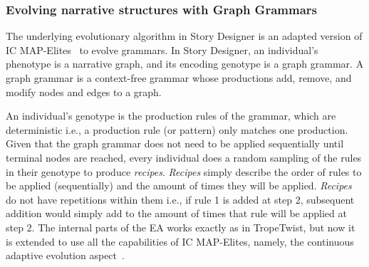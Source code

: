 




\subsubsection{Evolving narrative structures with Graph Grammars}

The underlying evolutionary algorithm in Story Designer is an adapted version of IC MAP-Elites~ to evolve grammars. In Story Designer, an individual's phenotype is a narrative graph, and its encoding genotype is a graph grammar. A graph grammar is a context-free grammar whose productions add, remove, and modify nodes and edges to a graph. 

An individual's genotype is the production rules of the grammar, which are deterministic i.e., a production rule (or pattern) only matches one production. Given that the graph grammar does not need to be applied sequentially until terminal nodes are reached, every individual does a random sampling of the rules in their genotype to produce \emph{recipes}. \emph{Recipes} simply describe the order of rules to be applied (sequentially) and the amount of times they will be applied. \emph{Recipes} do not have repetitions within them i.e., if rule 1 is added at step 2, subsequent addition would simply add to the amount of times that rule will be applied at step 2. The internal parts of the EA works exactly as in TropeTwist, but now it is extended to use all the capabilities of IC MAP-Elites, namely, the continuous adaptive evolution aspect~.

%


